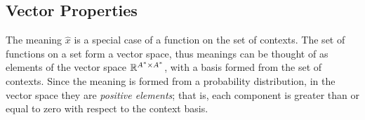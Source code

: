\documentclass[12pt]{report}
\newcommand{\Cont}{\mathrm{Cont}}
\begin{document}
\subsection{Vector Properties}

The meaning $\hat{x}$ is a special case of a function on the set of contexts. The set of functions on a set form a vector space, thus meanings can be thought of as elements of the vector space $\mathbb{R}^{A^* \times A^*}$, with a basis formed from the set of contexts. Since the meaning is formed from a probability distribution, in the vector space they are \emph{positive elements}; that is, each component is greater than or equal to zero with respect to the context basis.



\end{document}
